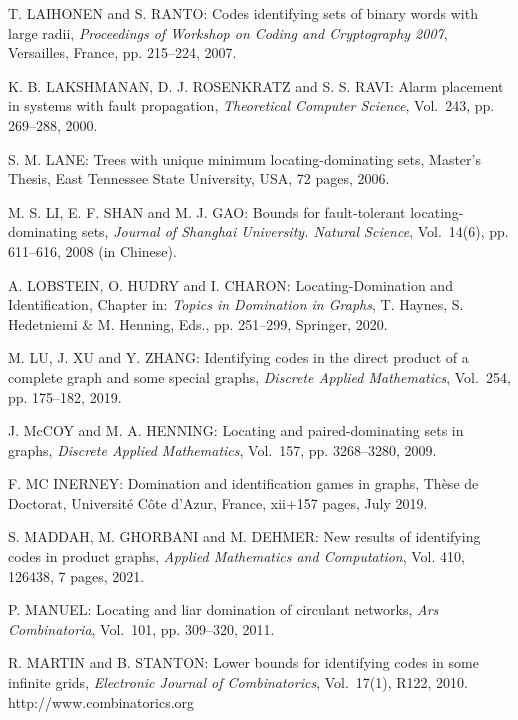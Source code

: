 \begin{thebibliography}{999}
T. LAIHONEN and S. RANTO: Codes identifying sets of binary words with large radii, {\it Proceedings of Workshop on Coding and Cryptography 2007}, Versailles, France, pp. 215--224, 2007.

K. B. LAKSHMANAN, D. J. ROSENKRATZ and S. S. RAVI: Alarm placement in systems with fault propagation, {\it Theoretical Computer Science}, Vol.~243, pp. 269--288, 2000.

S. M. LANE: Trees with unique minimum locating-dominating sets, Master's Thesis, East Tennessee State University, USA, 72 pages, 2006.

M. S. LI, E. F. SHAN and M. J. GAO: Bounds for fault-tolerant locating-dominating sets, {\it Journal of Shanghai University. Natural Science}, Vol.~14(6), pp. 611--616, 2008 (in Chinese).

A. LOBSTEIN, O. HUDRY and I. CHARON: Locating-Domination and Identification, Chapter in: {\it Topics in Domination in Graphs}, T. Haynes, S. Hedetniemi \& M. Henning, Eds., pp. 251--299, Springer, 2020.

M. LU, J. XU and Y. ZHANG: Identifying codes in the direct product of a complete graph and some special graphs, {\it Discrete Applied Mathematics}, Vol.~254, pp. 175--182, 2019.

J. McCOY and M. A. HENNING: Locating and paired-dominating sets in graphs, {\it Discrete Applied Mathematics}, Vol.~157, pp. 3268--3280, 2009.

F. MC INERNEY: Domination and identification games in graphs, Th\`ese de
Doctorat, Universit\'e C\^ote d'Azur, France, xii+157 pages, July 2019.

S. MADDAH, M. GHORBANI and M. DEHMER: New results of identifying codes in product graphs, {\it Applied Mathematics and Computation}, Vol. 410, 126438, 7 pages, 2021.

P. MANUEL: Locating and liar domination of circulant networks, {\it Ars Combinatoria}, Vol.~101, pp. 309--320, 2011.

%
%
R. MARTIN and B. STANTON: Lower bounds for identifying codes in some infinite grids, {\it Electronic Journal of Combinatorics}, Vol.~17(1), R122, 2010.\\
http://www.combinatorics.org


\end{thebibliography}
